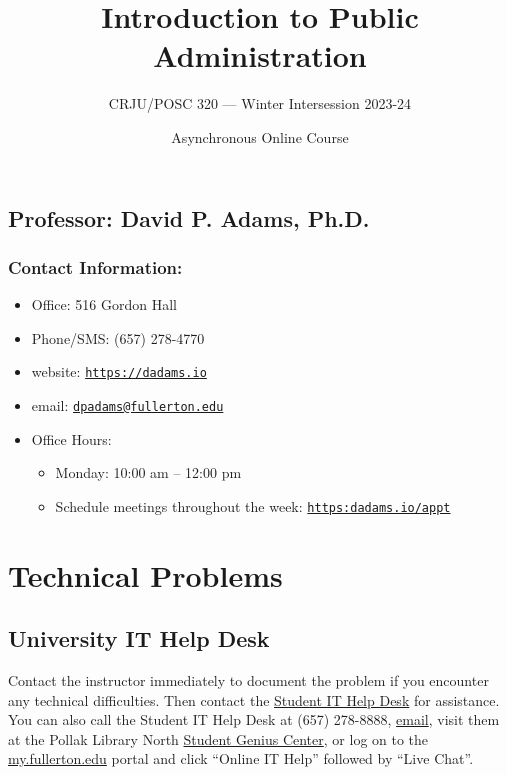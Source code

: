 \documentclass[11pt, letterpaper]{article}
\begin{document}
\title{Introduction to Public Administration}

\author{CRJU/POSC 320 — Winter Intersession 2023-24}
\date{Asynchronous Online Course}

    \maketitle


\subsection*{Professor: David P. Adams, Ph.D.}

\subsubsection*{Contact Information:}

\begin{itemize}
	\item Office: 516 Gordon Hall
	\item Phone/SMS: (657) 278-4770
	\item website: \href{https://dadams.io}{\texttt{https://dadams.io}}
	\item email: \href{dpadams@fullerton.edu}{\texttt{dpadams@fullerton.edu}}
	\item Office Hours:
        \begin{itemize}
            \item Monday: 10:00 am -- 12:00 pm
            \item Schedule meetings throughout the week: \href{https://dadams.io/appt}{\texttt{https:dadams.io/appt}}
        \end{itemize}
\end{itemize}


\section*{Technical Problems}

\subsection*{University IT Help Desk}

Contact the instructor immediately to document the problem if you encounter any technical difficulties. Then contact the \href{http://www.fullerton.edu/it/students/helpdesk/index.php}{Student IT Help Desk} for assistance. You can also call the Student IT Help Desk at (657) 278-8888, \href{mailto:StudentITHelpDesk@fullerton.edu}{email}, visit them at the Pollak Library North \href{http://www.fullerton.edu/it/students/sgc/index.php}{Student Genius Center}, or log on to the \href{http://my.fullerton.edu/}{my.fullerton.edu} portal and click ``Online IT Help'' followed by ``Live Chat''.
\end{document}
